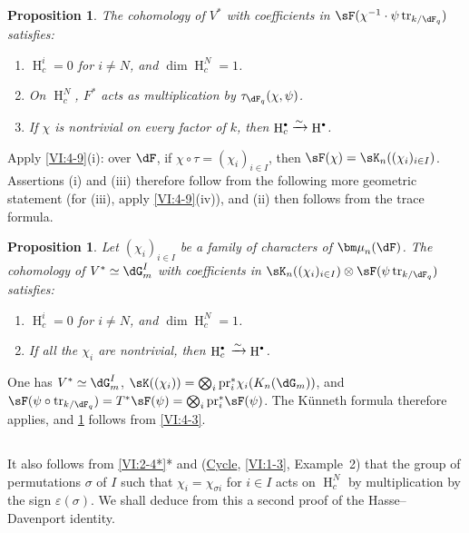 \documentclass[12pt,oneside,english]{smfbook}
\DeclareMathOperator{\h}{H}
\DeclareMathOperator{\tr}{tr}
\newcommand{\dmu}{{\bm\mu}}
\newcounter{char}
\newcommand{\iso}{\xrightarrow\sim}
\newcommand{\pr}{\mathrm{pr}} %
\newtheorem{proposition_}[subsection]{Proposition}
\let\oldbullet\bullet
\renewcommand{\bullet}{\textnormal{\tiny$\oldbullet$}}
\begin{document}
\begin{proposition_}\label{VI:4-10}
The cohomology of $V^\ast$ with coefficients in $\sF(\chi^{-1}\cdot\psi\tr_{k/\dF_q})$ satisfies:
\begin{enumerate}[\indent (i)]
  \item $\h_c^i=0$ for $i\ne N$, and $\dim\h_c^N=1$.
  \item On $\h_c^N$, $F^\ast$ acts as multiplication by $\tau_{\dF_q}(\chi,\psi)$.
  \item If $\chi$ is nontrivial on every factor of $k$, then $\h_c^\bullet\iso\h^\bullet$.
\end{enumerate}
\end{proposition_}

Apply \ref{VI:4-9}(i): over $\dF$, if $\chi\circ\tau=(\chi_i)_{i\in I}$, then $\sF(\chi)=\sK_n((\chi_i)_{i\in I})$. Assertions (i) and (iii) therefore follow from the following more geometric statement (for (iii), apply \ref{VI:4-9}(iv)), and (ii) then follows from the trace formula.

\begin{proposition_}\label{VI:4-11}
Let $(\chi_i)_{i\in I}$ be a family of characters of $\dmu_n(\dF)$. The cohomology of $V^\ast\simeq\dG_m^I$ with coefficients in $\sK_n((\chi_i)_{i\in I})\otimes\sF(\psi\tr_{k/\dF_q})$ satisfies:
\begin{enumerate}[\indent (i)]
  \item $\h_c^i{}=0$ for $i\ne N$, and $\dim\h_c^N{}=1$.
  \item If all the $\chi_i$ are nontrivial, then $\h_c^\bullet{}\iso\h^\bullet$.
\end{enumerate}
\end{proposition_}

One has $V^\ast\simeq\dG_m^I$, $\sK((\chi_i))=\bigotimes_i\pr_i^\ast\chi_i(K_n(\dG_m))$, and $\sF(\psi\circ\tr_{k/\dF_q})=T^\ast\sF(\psi) =\bigotimes_i\pr_i^\ast\sF(\psi)$. The Künneth formula therefore applies, and \ref{VI:4-11} follows from \ref{VI:4-3}.

\subsection{}\label{VI:4-12}

It also follows from \ref{VI:2-4*}* and (\hyperref[VI]{Cycle}, \ref{VI:1-3}, Example~2) that the group of permutations $\sigma$ of $I$ such that $\chi_i=\chi_{\sigma i}$ for $i\in I$ acts on $\h_c^N$ by multiplication by the sign $\varepsilon(\sigma)$. We shall deduce from this a second proof of the Hasse--Davenport identity.
\end{document}

